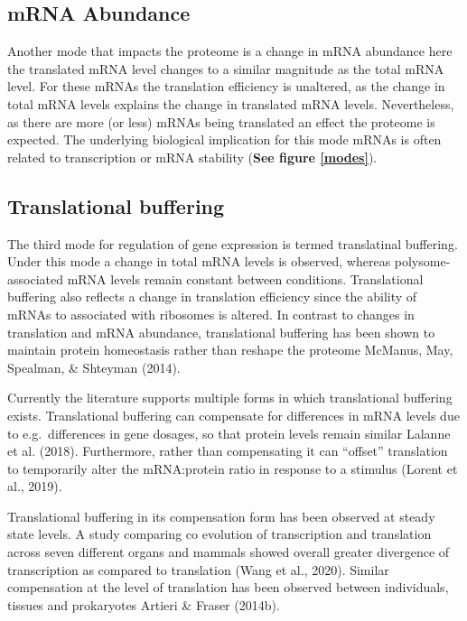 \documentclass[
  12pt,
  openany]{book}
\begin{document}
\subsection{mRNA Abundance}

Another mode that impacts the proteome is a change in mRNA abundance here the translated mRNA level changes to a similar magnitude as the total mRNA level. For these mRNAs the translation efficiency is unaltered, as the change in total mRNA levels explains the change in translated mRNA levels. Nevertheless, as there are more (or less) mRNAs being translated an effect the proteome is expected. The underlying biological implication for this mode mRNAs is often related to transcription or mRNA stability (\textbf{See figure \ref{modes}}).

\subsection{Translational buffering} \label{modeBuffering}

The third mode for regulation of gene expression is termed translatinal buffering. Under this mode a change in total mRNA levels is observed, whereas polysome-associated mRNA levels remain constant between conditions. Translational buffering also reflects a change in translation efficiency since the ability of mRNAs to associated with ribosomes is altered. In contrast to changes in translation and mRNA abundance, translational buffering has been shown to maintain protein homeostasis rather than reshape the proteome McManus, May, Spealman, \& Shteyman (2014).

Currently the literature supports multiple forms in which translational buffering exists. Translational buffering can compensate for differences in mRNA levels due to e.g.~differences in gene dosages, so that protein levels remain similar Lalanne et al. (2018). Furthermore, rather than compensating it can ``offset'' translation to temporarily alter the mRNA:protein ratio in response to a stimulus (Lorent et al., 2019).

Translational buffering in its compensation form has been observed at steady state levels. A study comparing co evolution of transcription and translation across seven different organs and mammals showed overall greater divergence of transcription as compared to translation (Wang et al., 2020). Similar compensation at the level of translation has been observed between individuals, tissues and prokaryotes Artieri \& Fraser (2014b).
\end{document}
